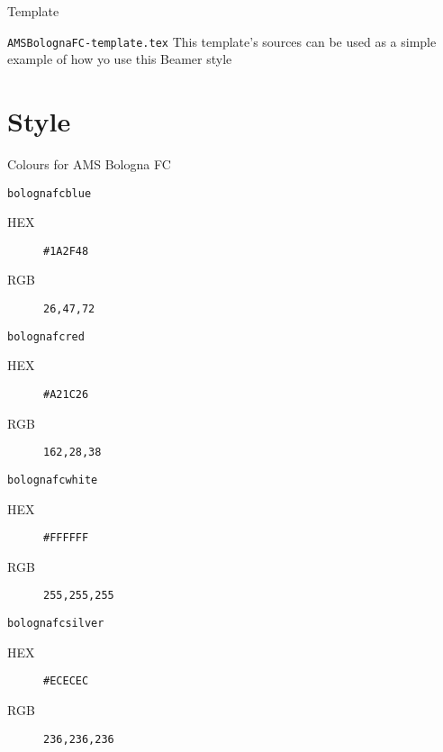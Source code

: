 \documentclass[presentation,apice]{beamer}\mode<presentation>{\usetheme{AMSBolognaFC}}
\begin{document}
\begin{frame}[c,fragile]{Template}
%
\begin{block}{\texttt{AMSBolognaFC-template.tex}}
This template's sources can be used as a simple example of how yo use this Beamer style
\end{block}
%
\end{frame}


\section{Style}

\begin{frame}[c,allowframebreaks]{Colours for AMS Bologna FC}
%
\begin{exampleblock}{\texttt{\textcolor{bolognafcblue}{bolognafcblue}}}
	\begin{description}
		\item[HEX] \texttt{\#1A2F48}
		\item[RGB] \texttt{26,47,72}
	\end{description}
\end{exampleblock}
\begin{exampleblock}{\texttt{\textcolor{bolognafcred}{bolognafcred}}}
	\begin{description}
		\item[HEX] \texttt{\#A21C26}
		\item[RGB] \texttt{162,28,38}
	\end{description}
\end{exampleblock}
\framebreak
\begin{block}{\texttt{\textcolor{bolognafcwhite}{bolognafcwhite}}}
	\begin{description}
		\item[HEX] \texttt{\#FFFFFF}
		\item[RGB] \texttt{255,255,255}
	\end{description}
\end{block}
\begin{alertblock}{\texttt{\textcolor{bolognafcsilver}{bolognafcsilver}}}
	\begin{description}
		\item[HEX] \texttt{\#ECECEC}
		\item[RGB] \texttt{236,236,236}
	\end{description}
\end{alertblock}
%
\end{frame}
\end{document}
